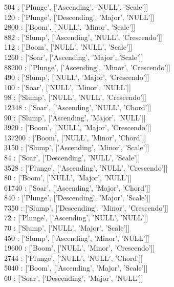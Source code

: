 {504     :  ['Plunge', ['Ascending', 'NULL', 'Scale']]\\
120     :  ['Plunge', ['Descending', 'Major', 'NULL']]\\
2800    :  ['Boom', ['NULL', 'Minor', 'Scale']]\\
882     :  ['Slump', ['Ascending', 'NULL', 'Crescendo']]\\
112     :  ['Boom', ['NULL', 'NULL', 'Scale']]\\
1260    :  ['Soar', ['Ascending', 'Major', 'Scale']]\\
88200   :  ['Plunge', ['Ascending', 'Minor', 'Crescendo']]\\
490     :  ['Slump', ['NULL', 'Major', 'Crescendo']]\\
100     :  ['Soar', ['NULL', 'Minor', 'NULL']]\\
98      :  ['Slump', ['NULL', 'NULL', 'Crescendo']]\\
12348   :  ['Soar', ['Ascending', 'NULL', 'Chord']]\\
90      :  ['Slump', ['Ascending', 'Major', 'NULL']]\\
3920    :  ['Boom', ['NULL', 'Major', 'Crescendo']]\\
137200  :  ['Boom', ['NULL', 'Minor', 'Chord']]\\
3150    :  ['Slump', ['Ascending', 'Minor', 'Scale']]\\
84      :  ['Soar', ['Descending', 'NULL', 'Scale']]\\
3528    :  ['Plunge', ['Ascending', 'NULL', 'Crescendo']]\\
80      :  ['Boom', ['NULL', 'Major', 'NULL']]\\
61740   :  ['Soar', ['Ascending', 'Major', 'Chord']]\\
840     :  ['Plunge', ['Descending', 'Major', 'Scale']]\\
7350    :  ['Slump', ['Descending', 'Minor', 'Crescendo']]\\
72      :  ['Plunge', ['Ascending', 'NULL', 'NULL']]\\
70      :  ['Slump', ['NULL', 'Major', 'Scale']]\\
450     :  ['Slump', ['Ascending', 'Minor', 'NULL']]\\
19600   :  ['Boom', ['NULL', 'Minor', 'Crescendo']]\\
2744    :  ['Plunge', ['NULL', 'NULL', 'Chord']]\\
5040    :  ['Boom', ['Ascending', 'Major', 'Scale']]\\
60      :  ['Soar', ['Descending', 'Major', 'NULL']]\\
}
